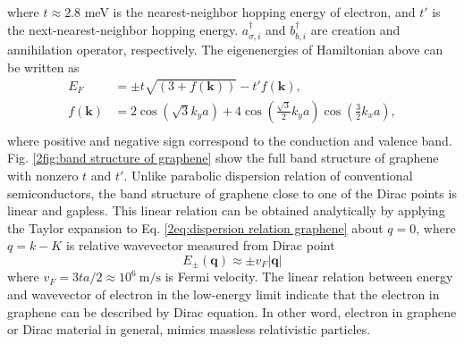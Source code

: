      where $t \approx 2.8$ meV is the nearest-neighbor hopping energy of electron, and $t'$ is the next-nearest-neighbor hopping energy.
     $a_{\sigma, i}^{\dagger}$ and $b_{b,i}^{\dagger}$ are creation and annihilation operator, respectively.
     The eigenenergies of Hamiltonian above can be written as
     \begin{equation} \label{2eq:dispersion relation graphene}
        \begin{aligned}
            E_F &= \pm t\sqrt{(3+f(\boldsymbol{k} ))} - t' f(\boldsymbol{k}),\\
            f({\boldsymbol{k}}) &= 2 \cos{(\sqrt{3} k_y a)}+ 4 \cos{\left(\frac{\sqrt{3}}{2} k_y a\right)} \cos{\left(\frac{3}{2} k_x a\right)},\\
        \end{aligned}
     \end{equation}
    where positive and negative sign correspond to the conduction and valence band.
    Fig. \ref{2fig:band structure of graphene} show the full band structure of graphene with nonzero $t$ and $t'$.
    Unlike parabolic dispersion relation of conventional semiconductors, the band structure of graphene close to one of the Dirac points is linear and gapless.
    This linear relation can be obtained analytically by applying the Taylor expansion to Eq. \ref{2eq:dispersion relation graphene} about $q = 0$, 
    where $q = k-K$ is relative wavevector measured from Dirac point
    \begin{equation} \label{2eq:approx energy dispersion}
        E_{\pm}(\boldsymbol{q})\approx \pm v_F |\boldsymbol{q}|        
    \end{equation}
    where $v_F = 3ta/2 \approx 10^6\ \mathrm{m/s}$  is Fermi velocity. 
    The linear relation between energy and wavevector of electron in the low-energy limit indicate that the electron in graphene can be described by Dirac equation.
    In other word, electron in graphene or Dirac material in general, mimics massless relativistic particles.
